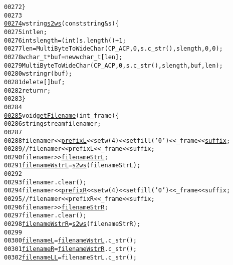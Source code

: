 \begin{footnotesize}
\begin{alltt}
00272 \}
00273 
\hypertarget{main_8cpp_source_l00274}{}\hyperlink{main_8cpp_aad6fe44abbb9cde538b5e84718ee3526}{00274} wstring \hyperlink{main_8cpp_aad6fe44abbb9cde538b5e84718ee3526}{s2ws}(\textcolor{keyword}{const} \textcolor{keywordtype}{string}& s) \{
00275         \textcolor{keywordtype}{int} len;
00276         \textcolor{keywordtype}{int} slength = (int)s.length() + 1;
00277         len = MultiByteToWideChar(CP\_ACP, 0, s.c\_str(), slength, 0, 0);
00278         \textcolor{keywordtype}{wchar\_t}* buf = \textcolor{keyword}{new} \textcolor{keywordtype}{wchar\_t}[len];
00279         MultiByteToWideChar(CP\_ACP, 0, s.c\_str(), slength, buf, len);
00280         wstring r(buf);
00281         \textcolor{keyword}{delete}[] buf;
00282         \textcolor{keywordflow}{return} r;
00283 \}
00284 
\hypertarget{main_8cpp_source_l00285}{}\hyperlink{main_8cpp_a6deb2598e68338891c9b1faadea263b9}{00285} \textcolor{keywordtype}{void} \hyperlink{main_8cpp_a6deb2598e68338891c9b1faadea263b9}{getFilename}(\textcolor{keywordtype}{int} \_frame) \{
00286         stringstream filenamer;
00287 
00288         filenamer<<\hyperlink{config_8h_a6082de4d3555d07a84270f7bacac9a63}{prefixL}<<setw(4)<<setfill(\textcolor{charliteral}{'0'})<<\_frame<<\hyperlink{config_8h_a887452eecbb8843e5530a1597eb8e357}{suffix};
00289         \textcolor{comment}{//filenamer<<prefixL<<\_frame<<suffix;}
00290         filenamer>>\hyperlink{config_8h_a65980faa7a98d89e3581eb3ac8777192}{filenameStrL};
00291         \hyperlink{config_8h_a526270325c61739d50933ee42ef9563f}{filenameWstrL} = \hyperlink{main_8cpp_aad6fe44abbb9cde538b5e84718ee3526}{s2ws}(filenameStrL);
00292 
00293         filenamer.clear();
00294         filenamer<<\hyperlink{config_8h_a939852ed72b1f29dd46c267ba1894687}{prefixR}<<setw(4)<<setfill(\textcolor{charliteral}{'0'})<<\_frame<<suffix;
00295         \textcolor{comment}{//filenamer<<prefixR<<\_frame<<suffix;}
00296         filenamer>>\hyperlink{config_8h_a19fa526345d6a5020afd0ef78ab58f71}{filenameStrR};
00297         filenamer.clear();
00298         \hyperlink{config_8h_a3b06e388f8261198f0fe86aafca02c41}{filenameWstrR} = \hyperlink{main_8cpp_aad6fe44abbb9cde538b5e84718ee3526}{s2ws}(filenameStrR);
00299 
00300         \hyperlink{config_8h_a9e78e5f975acc8e56d6a84214321a534}{filenameL} = \hyperlink{config_8h_a526270325c61739d50933ee42ef9563f}{filenameWstrL}.c\_str();
00301         \hyperlink{config_8h_ab2d091b589f33f799378b4dbf379e537}{filenameR} = \hyperlink{config_8h_a3b06e388f8261198f0fe86aafca02c41}{filenameWstrR}.c\_str();
00302         \hyperlink{config_8h_a4efd8a98fc24b184ad75501454b3c2b7}{filenameLL} = filenameStrL.c\_str();

\end{alltt}
\end{footnotesize}
